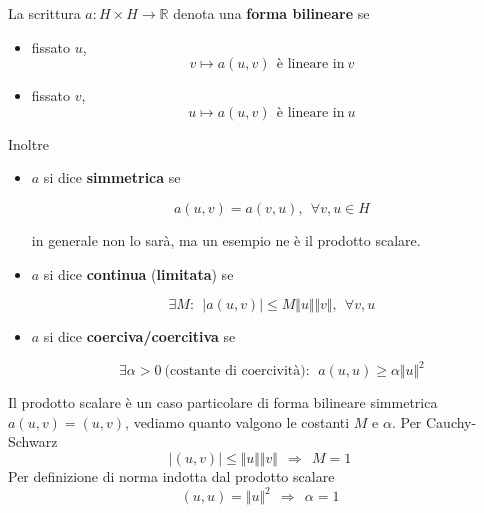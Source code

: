 \documentclass[10pt,a4paper,twoside,openright]{book}
\begin{document}
\begin{definition}
	La scrittura $a:H\times H\rightarrow \mathbb{R}$ denota una \textbf{forma bilineare} se
	\begin{itemize}
		\item fissato $u$,\begin{equation*}
		      v\mapsto a(u,v) \ \ \text{è lineare in} \ v
		\end{equation*}
		\item fissato $v$,\begin{equation*}
		      u\mapsto a(u,v) \ \ \text{è lineare in} \ u
		\end{equation*}
	\end{itemize}
\end{definition}
\begin{definition}
	Inoltre
	\begin{itemize}
		\item $a$ si dice \textbf{simmetrica} se
		      
		      \begin{equation*}
		      	a(u,v) =a(v,u),\ \ \forall v,u\in H
		      \end{equation*}
		      
		      in generale non lo sarà, ma un esempio ne è il prodotto scalare.
		\item $a$ si dice \textbf{continua} (\textbf{limitata}) se
		      
		      \begin{equation*}
		      	\exists M:\ \ | a(u,v)| \leqslant M\Vert u\Vert \Vert v\Vert,\ \ \forall v,u
		      \end{equation*}
		\item $a$ si dice \textbf{coerciva/coercitiva} se
		      
		      \begin{equation*}
		      	\exists \alpha  >0\ \text{(costante di coercività)} :\ \ a(u,u) \geqslant \alpha \Vert u\Vert ^{2}
		      \end{equation*}
	\end{itemize}
\end{definition}
Il prodotto scalare è un caso particolare di forma bilineare simmetrica $a(u,v) =(u,v)$, vediamo quanto valgono le costanti $M$ e $\alpha $. Per Cauchy-Schwarz
\begin{equation*}
	| (u,v)| \leqslant \Vert u\Vert \Vert v\Vert \ \ \Rightarrow \ \ M=1
\end{equation*}
Per definizione di norma indotta dal prodotto scalare
\begin{equation*}
	(u,u) =\Vert u\Vert ^{2} \ \ \Rightarrow \ \ \alpha =1
\end{equation*}
\end{document}
